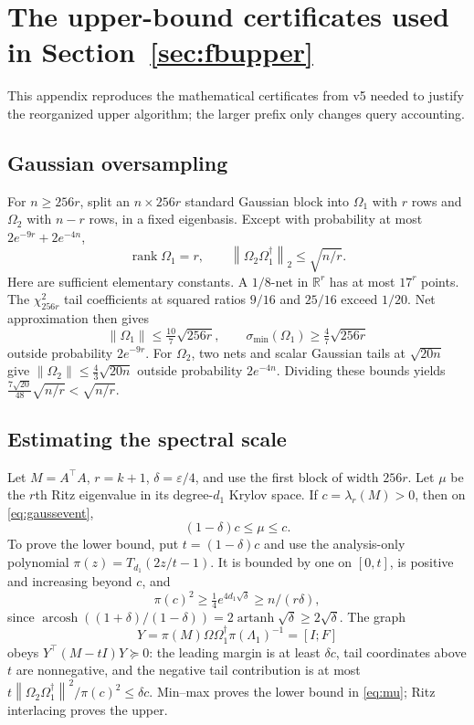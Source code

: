 \documentclass[11pt]{article}
\theoremstyle{definition}
\newcommand{\R}{\mathbb R}
\newcommand{\norm}[1]{\left\lVert#1\right\rVert}
\begin{document}
\section{The upper-bound certificates used in Section~\ref{sec:fbupper}}\label{app:upper}
This appendix reproduces the mathematical certificates from v5 needed to justify the reorganized upper algorithm; the larger prefix only changes query accounting.

\subsection{Gaussian oversampling}
For $n\ge256r$, split an $n\times256r$ standard Gaussian block into $\Omega_1$ with $r$ rows and $\Omega_2$ with $n-r$ rows, in a fixed eigenbasis. Except with probability at most $2e^{-9r}+2e^{-4n}$,
\begin{equation}\label{eq:gaussevent}
\operatorname{rank}\Omega_1=r,\qquad
\norm{\Omega_2\Omega_1^\dagger}_2\le\sqrt{n/r}.
\end{equation}
Here are sufficient elementary constants. A $1/8$-net in $\R^r$ has at most $17^r$ points. The $\chi^2_{256r}$ tail coefficients at squared ratios $9/16$ and $25/16$ exceed $1/20$. Net approximation then gives
\[
\norm{\Omega_1}\le\tfrac{10}{7}\sqrt{256r},\qquad
\sigma_{\min}(\Omega_1)\ge\tfrac47\sqrt{256r}
\]
outside probability $2e^{-9r}$. For $\Omega_2$, two nets and scalar Gaussian tails at $\sqrt{20n}$ give $\norm{\Omega_2}\le\tfrac43\sqrt{20n}$ outside probability $2e^{-4n}$. Dividing these bounds yields $\tfrac{7\sqrt{20}}{48}\sqrt{n/r}<\sqrt{n/r}$.

\subsection{Estimating the spectral scale}
Let $M=A^\top A$, $r=k+1$, $\delta=\varepsilon/4$, and use the first block of width $256r$. Let $\mu$ be the $r$th Ritz eigenvalue in its degree-$d_1$ Krylov space. If $c=\lambda_r(M)>0$, then on \eqref{eq:gaussevent},
\begin{equation}\label{eq:mu}
(1-\delta)c\le\mu\le c.
\end{equation}
To prove the lower bound, put $t=(1-\delta)c$ and use the analysis-only polynomial $\pi(z)=T_{d_1}(2z/t-1)$. It is bounded by one on $[0,t]$, is positive and increasing beyond $c$, and
\[
\pi(c)^2\ge\tfrac14 e^{4d_1\sqrt\delta}\ge n/(r\delta),
\]
since $\operatorname{arcosh}((1+\delta)/(1-\delta))=2\operatorname{artanh}\sqrt\delta\ge2\sqrt\delta$. The graph
\[
Y=\pi(M)\Omega\Omega_1^\dagger\pi(\Lambda_1)^{-1}=[I;F]
\]
obeys $Y^\top(M-tI)Y\succeq0$: the leading margin is at least $\delta c$, tail coordinates above $t$ are nonnegative, and the negative tail contribution is at most $t\norm{\Omega_2\Omega_1^\dagger}^2/\pi(c)^2\le\delta c$. Min--max proves the lower bound in \eqref{eq:mu}; Ritz interlacing proves the upper.
\end{document}
